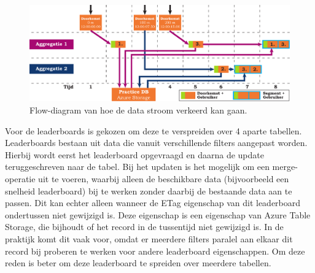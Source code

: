 \begin{figure}[ht]
  \begin{center}
    \includegraphics[width=\textwidth]{style/images/aggregatie-timing-problem}
  \end{center}
  \caption{Flow-diagram van hoe de data stroom verkeerd kan gaan.}
  \label{fig:aggregatie-timing-problem}
\end{figure}

Voor de leaderboards is gekozen om deze te verspreiden over 4 aparte tabellen. Leaderboards bestaan uit data die vanuit verschillende filters aangepast worden. Hierbij wordt eerst het leaderboard opgevraagd en daarna de update teruggeschreven naar de tabel. Bij het updaten is het mogelijk om een merge-operatie uit te voeren, waarbij alleen de beschikbare data (bijvoorbeeld een snelheid leaderboard) bij te werken zonder daarbij de bestaande data aan te passen. Dit kan echter alleen wanneer de ETag eigenschap van dit leaderboard ondertussen niet gewijzigd is. Deze eigenschap is een eigenschap van Azure Table Storage, die bijhoudt of het record in de tussentijd niet gewijzigd is. In de praktijk komt dit vaak voor, omdat er meerdere filters paralel aan elkaar dit record bij proberen te werken voor andere leaderboard eigenschappen. Om deze reden is beter om deze leaderboard te spreiden over meerdere tabellen.

